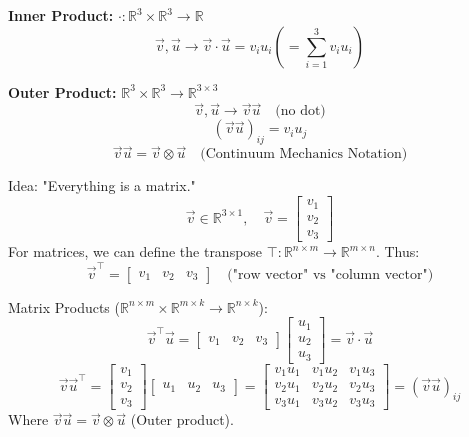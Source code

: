\textbf{Inner Product:} $\cdot : \mathbb{R}^3 \times \mathbb{R}^3 \rightarrow \mathbb{R}$
$$ \vec{v}, \vec{u} \rightarrow \vec{v} \cdot \vec{u} = v_i u_i \left( = \sum_{i=1}^3 v_i u_i \right) $$

\textbf{Outer Product:} $\mathbb{R}^3 \times \mathbb{R}^3 \rightarrow \mathbb{R}^{3 \times 3}$
$$ \vec{v}, \vec{u} \rightarrow \vec{v}\vec{u} \quad \text{(no dot)} $$
$$ (\vec{v}\vec{u})_{ij} = v_i u_j $$
$$ \vec{v}\vec{u} = \vec{v} \otimes \vec{u} \quad \text{(Continuum Mechanics Notation)} $$

\begin{notebox}
Idea: "Everything is a matrix."
$$ \vec{v} \in \mathbb{R}^{3 \times 1}, \quad \vec{v} = \begin{bmatrix} v_1 \\ v_2 \\ v_3 \end{bmatrix} $$
For matrices, we can define the transpose $\top : \mathbb{R}^{n \times m} \rightarrow \mathbb{R}^{m \times n}$.
Thus:
$$ \vec{v}^\top = \begin{bmatrix} v_1 & v_2 & v_3 \end{bmatrix} \quad \text{("row vector" vs "column vector")} $$

Matrix Products ($\mathbb{R}^{n \times m} \times \mathbb{R}^{m \times k} \rightarrow \mathbb{R}^{n \times k}$):
$$ \vec{v}^\top \vec{u} = \begin{bmatrix} v_1 & v_2 & v_3 \end{bmatrix} \begin{bmatrix} u_1 \\ u_2 \\ u_3 \end{bmatrix} = \vec{v} \cdot \vec{u} $$
$$ \vec{v} \vec{u}^\top = \begin{bmatrix} v_1 \\ v_2 \\ v_3 \end{bmatrix} \begin{bmatrix} u_1 & u_2 & u_3 \end{bmatrix} = \begin{bmatrix} v_1 u_1 & v_1 u_2 & v_1 u_3 \\ v_2 u_1 & v_2 u_2 & v_2 u_3 \\ v_3 u_1 & v_3 u_2 & v_3 u_3 \end{bmatrix} = (\vec{v}\vec{u})_{ij} $$
Where $\vec{v}\vec{u} = \vec{v} \otimes \vec{u}$ (Outer product).
\end{notebox}

